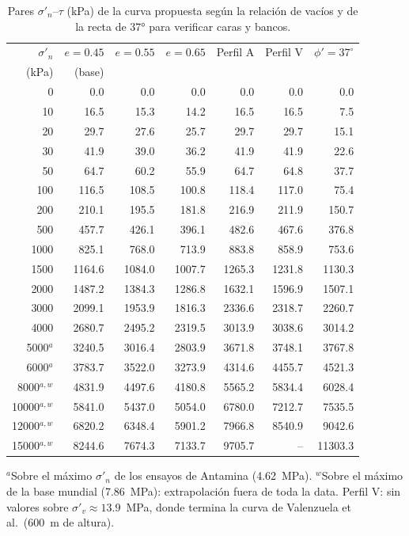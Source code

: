 \documentclass[11pt,letterpaper]{article}
\begin{document}
\begin{table}[!htbp]\centering\small\caption{Pares $\sigma'_n$--$\tau$ (kPa) de la curva propuesta según la relación de vacíos y de la recta de 37° para verificar caras y bancos.}\label{tab:slide_e}
\setlength{\tabcolsep}{4pt}\begin{tabular}{rrrrrrr}\toprule $\sigma'_n$ & $e = 0.45$ & $e = 0.55$ & $e = 0.65$ & Perfil A & Perfil V & $\phi' = 37^{\circ}$\\
(kPa) & (base) & & & & & \\\midrule
0 & 0.0 & 0.0 & 0.0 & 0.0 & 0.0 & 0.0 \\
10 & 16.5 & 15.3 & 14.2 & 16.5 & 16.5 & 7.5 \\
20 & 29.7 & 27.6 & 25.7 & 29.7 & 29.7 & 15.1 \\
30 & 41.9 & 39.0 & 36.2 & 41.9 & 41.9 & 22.6 \\
50 & 64.7 & 60.2 & 55.9 & 64.7 & 64.8 & 37.7 \\
100 & 116.5 & 108.5 & 100.8 & 118.4 & 117.0 & 75.4 \\
200 & 210.1 & 195.5 & 181.8 & 216.9 & 211.9 & 150.7 \\
500 & 457.7 & 426.1 & 396.1 & 482.6 & 467.6 & 376.8 \\
1000 & 825.1 & 768.0 & 713.9 & 883.8 & 858.9 & 753.6 \\
1500 & 1164.6 & 1084.0 & 1007.7 & 1265.3 & 1231.8 & 1130.3 \\
2000 & 1487.2 & 1384.3 & 1286.8 & 1632.1 & 1596.9 & 1507.1 \\
3000 & 2099.1 & 1953.9 & 1816.3 & 2336.6 & 2318.7 & 2260.7 \\
4000 & 2680.7 & 2495.2 & 2319.5 & 3013.9 & 3038.6 & 3014.2 \\
5000$^{a}$ & 3240.5 & 3016.4 & 2803.9 & 3671.8 & 3748.1 & 3767.8 \\
6000$^{a}$ & 3783.7 & 3522.0 & 3273.9 & 4314.6 & 4455.7 & 4521.3 \\
8000$^{a,w}$ & 4831.9 & 4497.6 & 4180.8 & 5565.2 & 5834.4 & 6028.4 \\
10000$^{a,w}$ & 5841.0 & 5437.0 & 5054.0 & 6780.0 & 7212.7 & 7535.5 \\
12000$^{a,w}$ & 6820.2 & 6348.4 & 5901.2 & 7966.8 & 8540.9 & 9042.6 \\
15000$^{a,w}$ & 8244.6 & 7674.3 & 7133.7 & 9705.7 & -- & 11303.3 \\
\bottomrule\end{tabular}\par\vspace{3pt}\footnotesize $^{a}$Sobre el máximo $\sigma'_n$ de los ensayos de Antamina (4.62~MPa). $^{w}$Sobre el máximo de la base mundial (7.86~MPa): extrapolación fuera de toda la data. Perfil V: sin valores sobre $\sigma'_v \approx 13.9$~MPa, donde termina la curva de Valenzuela et al.\ (600~m de altura).\end{table}
\end{document}
